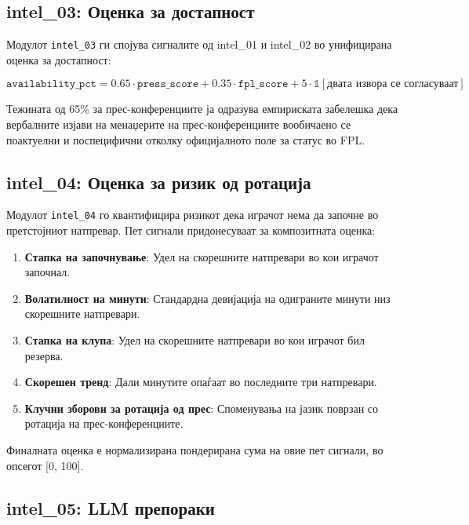 \subsection{intel\_03: Оценка за достапност}

Модулот \texttt{intel\_03} ги спојува сигналите од intel\_01 и intel\_02 во унифицирана оценка за достапност:

\begin{equation}
\texttt{availability\_pct} = 0.65 \cdot \texttt{press\_score} + 0.35 \cdot \texttt{fpl\_score} + 5 \cdot \mathbb{1}[\text{двата извора се согласуваат}]
\end{equation}

Тежината од 65\% за прес-конференциите ја одразува емпириската забелешка дека вербалните изјави на менаџерите на прес-конференциите вообичаено се поактуелни и поспецифични отколку официјалното поле за статус во FPL.

\subsection{intel\_04: Оценка за ризик од ротација}

Модулот \texttt{intel\_04} го квантифицира ризикот дека играчот нема да започне во претстојниот натпревар. Пет сигнали придонесуваат за композитната оценка:

\begin{enumerate}
  \item \textbf{Стапка на започнување}: Удел на скорешните натпревари во кои играчот започнал.
  \item \textbf{Волатилност на минути}: Стандардна девијација на одиграните минути низ скорешните натпревари.
  \item \textbf{Стапка на клупа}: Удел на скорешните натпревари во кои играчот бил резерва.
  \item \textbf{Скорешен тренд}: Дали минутите опаѓаат во последните три натпревари.
  \item \textbf{Клучни зборови за ротација од прес}: Споменувања на јазик поврзан со ротација на прес-конференциите.
\end{enumerate}

Финалната оценка е нормализирана пондерирана сума на овие пет сигнали, во опсегот [0, 100].

\subsection{intel\_05: LLM препораки}

